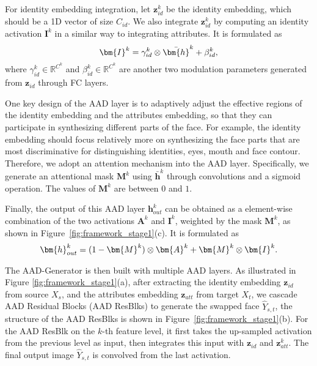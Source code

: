 For identity embedding integration, let $\bm{z}_{id}^k$ be the identity embedding, which should be a 1D vector of size $C_{id}$.
We also integrate $\bm{z}_{id}^k$ by computing an identity activation $\bm{I}^k$ in a similar way to integrating attributes. It is formulated as
\vspace{-0.5em}
\begin{equation}
\vspace{-0.5em}
\label{eqn:AdaIN}
\bm{I}^k = \gamma^k_{id} \otimes \bar{\bm{h}}^k + \beta_{id}^k,
\end{equation}
where $\gamma^k_{id} \in \mathbb{R}^{C^k}$ and $\beta^k_{id} \in \mathbb{R}^{C^k}$ are another two modulation parameters generated from $\bm{z}_{id}$ through FC layers. 

One key design of the AAD layer is to adaptively adjust the effective regions of the identity embedding and the attributes embedding, so that they can participate in synthesizing different parts of the face. For example, the identity embedding should focus relatively more on synthesizing the face parts that are most discriminative for distinguishing identities, \eg eyes, mouth and face contour. 
Therefore, we adopt an attention mechanism into the AAD layer. 
Specifically, we generate an attentional mask $\bm{M}^k$ using $\bar{\bm{h}}^k$ through convolutions and a sigmoid operation. The values of $\bm{M}^k$ are between $0$ and $1$.

Finally, the output of this AAD layer $\bm{h}^k_{out}$ can be obtained as a element-wise combination of the two activations $\bm{A}^k$ and $\bm{I}^k$, weighted by the mask $\bm{M}^k$, as shown in Figure~\ref{fig:framework_stage1}(c). It is formulated as
\vspace{-0.5em}
\begin{equation}
\vspace{-0.5em}
\label{eqn:Mask}
 \bm{h}^k_{out} = (1 - \bm{M}^k) \otimes \bm{A}^k + \bm{M}^k \otimes \bm{I}^k.
\end{equation}

The AAD-Generator is then built with multiple AAD layers.
As illustrated in Figure \ref{fig:framework_stage1}(a), after extracting the identity embedding $\bm{z}_{id}$ from source $X_s$, and the attributes embedding $\bm{z}_{att}$ from target $X_t$, we cascade AAD Residual Blocks (AAD ResBlks) to generate the swapped face $\hat{Y}_{s,t}$, the structure of the AAD ResBlks is shown in Figure~\ref{fig:framework_stage1}(b). For the AAD ResBlk on the $k$-th feature level, it first takes the up-sampled activation from the previous level as input, then integrates this input with $\bm{z}_{id}$ and $\bm{z}^k_{att}$. The final output image $\hat{Y}_{s,t}$ is convolved from the last activation.

